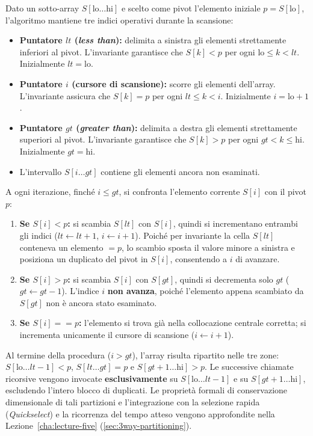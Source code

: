 Dato un sotto-array $S[\text{lo} \dots \text{hi}]$ e scelto come pivot l'elemento iniziale $p = S[\text{lo}]$, l'algoritmo mantiene tre indici operativi durante la scansione:
\begin{itemize}
  \item \textbf{Puntatore $lt$ (\textit{less than}):} delimita a sinistra gli elementi strettamente inferiori al pivot. L'invariante garantisce che $S[k] < p$ per ogni $\text{lo} \le k < lt$. Inizialmente $lt = \text{lo}$.
  \item \textbf{Puntatore $i$ (cursore di scansione):} scorre gli elementi dell'array. L'invariante assicura che $S[k] = p$ per ogni $lt \le k < i$. Inizialmente $i = \text{lo} + 1$.
  \item \textbf{Puntatore $gt$ (\textit{greater than}):} delimita a destra gli elementi strettamente superiori al pivot. L'invariante garantisce che $S[k] > p$ per ogni $gt < k \le \text{hi}$. Inizialmente $gt = \text{hi}$.
  \item L'intervallo $S[i \dots gt]$ contiene gli elementi ancora non esaminati.
\end{itemize}

A ogni iterazione, finché $i \le gt$, si confronta l'elemento corrente $S[i]$ con il pivot $p$:
\begin{enumerate}
  \item \textbf{Se $S[i] < p$:} si scambia $S[lt]$ con $S[i]$, quindi si incrementano entrambi gli indici ($lt \leftarrow lt + 1$, $i \leftarrow i + 1$). Poiché per invariante la cella $S[lt]$ conteneva un elemento $= p$, lo scambio sposta il valore minore a sinistra e posiziona un duplicato del pivot in $S[i]$, consentendo a $i$ di avanzare.
  \item \textbf{Se $S[i] > p$:} si scambia $S[i]$ con $S[gt]$, quindi si decrementa solo $gt$ ($gt \leftarrow gt - 1$). L'indice $i$ \textbf{non avanza}, poiché l'elemento appena scambiato da $S[gt]$ non è ancora stato esaminato.
  \item \textbf{Se $S[i] == p$:} l'elemento si trova già nella collocazione centrale corretta; si incrementa unicamente il cursore di scansione ($i \leftarrow i + 1$).
\end{enumerate}

Al termine della procedura ($i > gt$), l'array risulta ripartito nelle tre zone: $S[\text{lo} \dots lt-1] < p$, $S[lt \dots gt] = p$ e $S[gt+1 \dots \text{hi}] > p$. Le successive chiamate ricorsive vengono invocate \textbf{esclusivamente} su $S[\text{lo} \dots lt-1]$ e su $S[gt+1 \dots \text{hi}]$, escludendo l'intero blocco di duplicati. Le proprietà formali di conservazione dimensionale di tali partizioni e l'integrazione con la selezione rapida (\textit{Quickselect}) e la ricorrenza del tempo atteso vengono approfondite nella Lezione~\ref{cha:lecture-five} (\autoref{sec:3way-partitioning}).

